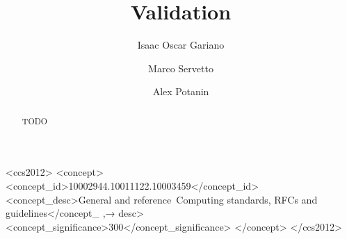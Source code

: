 \documentclass[english,submission,code=tt]{programming}
\theoremstyle{plain}
\begin{document}
\title{Validation}
\author{Isaac Oscar Gariano}
\author{Marco Servetto}
\author{Alex Potanin}

\begin{CCSXML}
<ccs2012>
<concept>
<concept_id>10002944.10011122.10003459</concept_id>
<concept_desc>General and reference~Computing standards, RFCs and guidelines</concept_
,→ desc>
<concept_significance>300</concept_significance>
</concept>
</ccs2012>
\end{CCSXML}
\maketitle

\begin{abstract}
TODO

\end{abstract}




%





%
%
\end{document}
